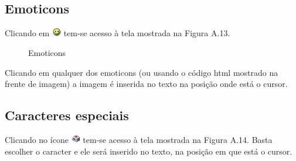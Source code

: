 \subsection{Emoticons}


Clicando em \includegraphics[width=0.4cm]{imagem/cap0/emoticons.jpg} tem-se acesso à tela mostrada na Figura A.13.

\begin{figure}
 \begin{center}
  \caption{Emoticons}
 \end{center}
\end{figure}

Clicando em qualquer dos emoticons (ou usando o código html mostrado na frente de imagem) a imagem é inserida no texto na posição onde está o cursor.

\subsection{Caracteres especiais}


Clicando no ícone \includegraphics[width=0.4cm]{imagem/cap0/char.jpg} tem-se acesso à tela mostrada na Figura A.14. Basta escolher o caracter e ele será inserido no texto, na posição em que está o cursor.

